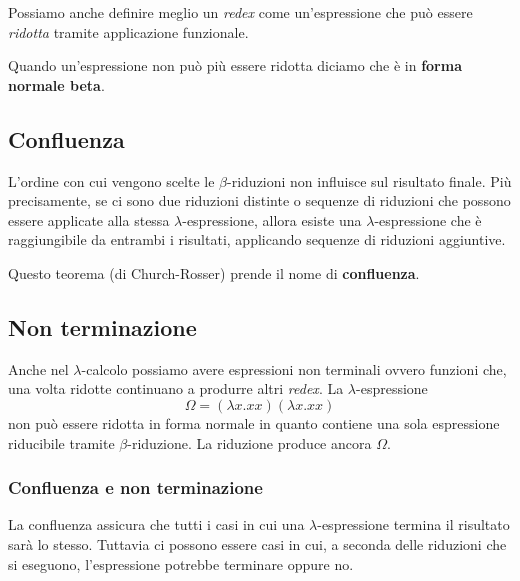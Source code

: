 Possiamo anche definire meglio un \emph{redex} come un'espressione che può essere \emph{ridotta} tramite applicazione
funzionale.

Quando un'espressione non può più essere ridotta diciamo che è in \textbf{forma normale beta}.

\subsection{Confluenza}
L'ordine con cui vengono scelte le $\beta$-riduzioni non influisce sul risultato finale. Più precisamente, se ci sono
due riduzioni distinte o sequenze di riduzioni che possono essere applicate alla stessa $\lambda$-espressione, allora
esiste una $\lambda$-espressione che è raggiungibile da entrambi i risultati, applicando sequenze di riduzioni
aggiuntive.

Questo teorema (di Church-Rosser) prende il nome di \textbf{confluenza}.

\subsection{Non terminazione}
Anche nel $\lambda$-calcolo possiamo avere espressioni non terminali ovvero funzioni che, una volta ridotte continuano
a produrre altri \emph{redex}. La $\lambda$-espressione
\[ \Omega = (\lambda x.xx) (\lambda x.xx) \]
non può essere ridotta in forma normale in quanto contiene una sola espressione riducibile tramite $\beta$-riduzione.
La riduzione produce ancora $\Omega$.

\subsubsection{Confluenza e non terminazione}
La confluenza assicura che tutti i casi in cui una $\lambda$-espressione termina il risultato sarà lo stesso. Tuttavia
ci possono essere casi in cui, a seconda delle riduzioni che si eseguono, l'espressione potrebbe terminare oppure no.
